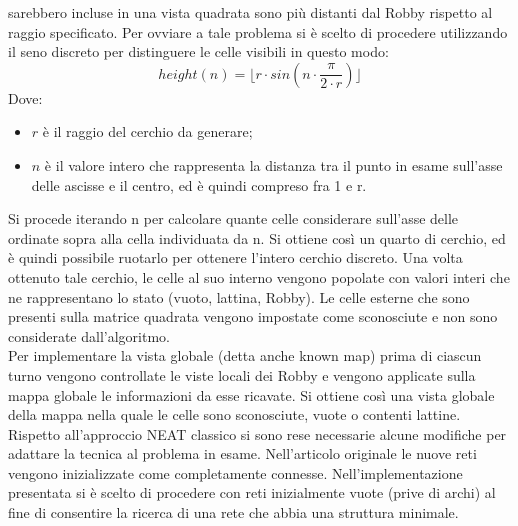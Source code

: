 sarebbero incluse in una vista quadrata sono più distanti dal Robby rispetto al 
raggio specificato. Per ovviare a tale problema si è scelto di procedere 
utilizzando il seno discreto per distinguere le celle visibili in questo modo:
\[height(n)=\lfloor r \cdot sin(n\cdot\frac{\pi}{2\cdot r})\rfloor \]
Dove:
\begin{itemize}
  \item $r$ è il raggio del cerchio da generare; 
  \item $n$ è il valore intero che rappresenta la distanza tra il punto in 
  esame sull'asse delle ascisse e il centro, ed è quindi compreso fra 1 e r.
\end{itemize}
Si procede iterando n per calcolare quante celle considerare sull'asse delle 
ordinate sopra alla cella individuata da n. Si ottiene così un quarto di 
cerchio, ed è quindi possibile ruotarlo per ottenere l'intero cerchio discreto.
Una volta ottenuto tale cerchio, le celle al suo interno vengono popolate con 
valori interi che ne rappresentano lo stato (vuoto, lattina, Robby). Le celle 
esterne che sono presenti sulla matrice quadrata vengono impostate come 
sconosciute e non sono considerate dall'algoritmo.
\\
Per implementare la vista globale (detta anche known map) prima di ciascun 
turno vengono controllate le viste locali dei Robby e vengono applicate sulla 
mappa globale le informazioni da esse ricavate. Si ottiene così una vista
globale della mappa nella quale le celle sono sconosciute, vuote o contenti
lattine.
\\

Rispetto all'approccio NEAT classico si sono rese necessarie alcune modifiche
per adattare la tecnica al problema in esame. Nell'articolo 
originale\cite{stanley2002evolving} le nuove reti
vengono inizializzate come completamente connesse. Nell'implementazione
presentata si è scelto di procedere con reti inizialmente vuote (prive di
archi) al fine di consentire la ricerca di una rete che abbia una struttura
minimale.\\

